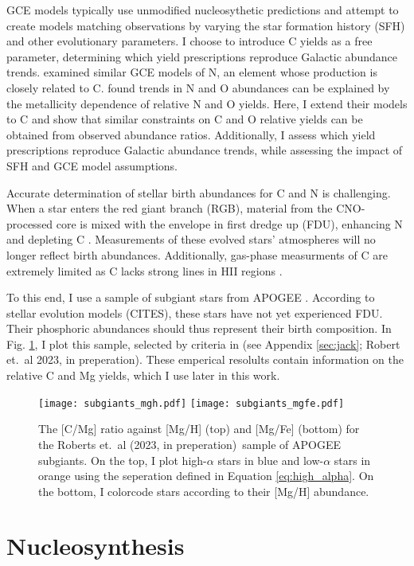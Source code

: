\documentclass[12pt,oneside]{report}
\newcommand{\citetjack}{Roberts et.\ al (2023, in preperation)}
\newcommand{\citealtjack}{Robert et.\ al 2023, in preperation}
\begin{document}
GCE models typically use unmodified nucleosythetic predictions and attempt to create models matching observations by varying the star formation history (SFH) and other evolutionary parameters. I choose to introduce C yields as a free parameter, determining which yield prescriptions reproduce Galactic abundance trends.
\cite{james+23} examined similar GCE models of N, an element whose production is closely related to C. \cite{james+23} found trends in N and O abundances can be explained by the metallicity dependence of relative N and O yields. Here, I extend their models to C and show that similar constraints on C and O relative yields can be obtained from observed abundance ratios. Additionally, I assess which yield prescriptions reproduce Galactic abundance trends, while assessing the impact of SFH and GCE model assumptions.

Accurate determination of stellar birth abundances for C and N is challenging. When a star enters the red giant branch (RGB), material from the CNO-processed core is mixed with the envelope in first dredge up (FDU), enhancing N and depleting C \citep{iben67, vincenzo+21,KL14}. Measurements of these evolved stars'  atmospheres will no longer reflect birth abundances.  Additionally, gas-phase measurments of C are extremely limited as C lacks strong lines in HII regions \citep{skillman+20}.

To this end, I use a sample of subgiant stars from APOGEE \citep{apogee17}. According to stellar evolution models (CITES), these stars have not yet experienced FDU. Their phosphoric abundances should thus represent their birth composition.  In Fig. \ref{fig:subgiants}, I plot this sample, selected by criteria in (see Appendix \ref{sec:jack}; \citealtjack). These emperical resolults contain information on the relative C and Mg yields, which I use later in this work.


\begin{figure}[htp]
    \texttt{[image: subgiants\_mgh.pdf]}
    \texttt{[image: subgiants\_mgfe.pdf]}
    \caption[APOGEE Subgiants]{The [C/Mg] ratio against [Mg/H] (top) and [Mg/Fe] (bottom) for the \citetjack~sample of APOGEE subgiants. On the top, I plot high-$\alpha$ stars in blue and low-$\alpha$ stars in orange using the seperation defined in Equation \ref{eq:high_alpha}. On the bottom, I colorcode stars according to their [Mg/H] abundance.}
    \label{fig:subgiants}
\end{figure}
\chapter{Nucleosynthesis}
\end{document}
